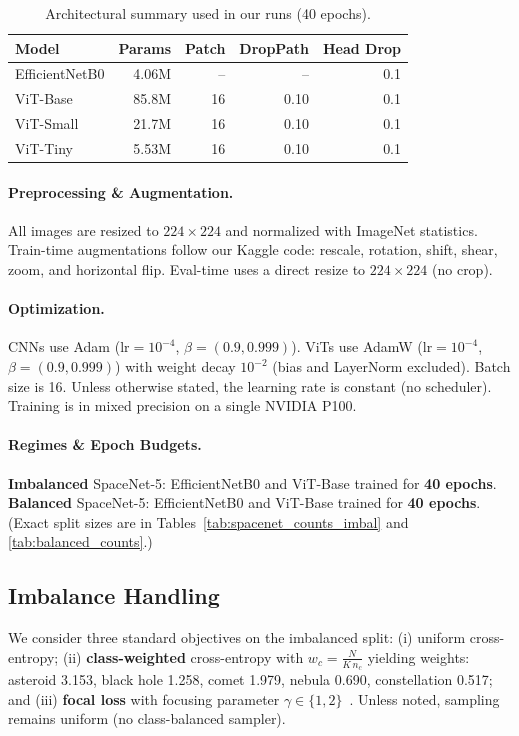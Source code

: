 \begin{table}[!t]
\centering
\caption{Architectural summary used in our runs (40 epochs).}
\begin{tabular}{lrrrr}
\toprule
Model          & Params & Patch & DropPath & Head Drop \\
\midrule
EfficientNetB0 & 4.06M  & --    & --       & 0.1 \\
ViT-Base       & 85.8M  & 16    & 0.10     & 0.1 \\
ViT-Small      & 21.7M  & 16    & 0.10     & 0.1 \\
ViT-Tiny       & 5.53M  & 16    & 0.10     & 0.1 \\
\bottomrule
\end{tabular}
\label{tab:model_configs}
\end{table}


\paragraph*{Preprocessing \& Augmentation.}
All images are resized to $224\times224$ and normalized with ImageNet statistics.
Train-time augmentations follow our Kaggle code: rescale, rotation, shift, shear, zoom, and horizontal flip.
Eval-time uses a direct resize to $224\times224$ (no crop).

\paragraph*{Optimization.}
CNNs use Adam ($\mathrm{lr}{=}10^{-4}$, $\beta{=}(0.9,0.999)$). ViTs use AdamW ($\mathrm{lr}{=}10^{-4}$, $\beta{=}(0.9,0.999)$) with weight decay $10^{-2}$ (bias and LayerNorm excluded).
Batch size is 16. Unless otherwise stated, the learning rate is constant (no scheduler).
Training is in mixed precision on a single NVIDIA P100.

\paragraph*{Regimes \& Epoch Budgets.}
\textbf{Imbalanced} SpaceNet-5: EfficientNetB0 and ViT-Base trained for \textbf{40 epochs}.
\textbf{Balanced} SpaceNet-5: EfficientNetB0 and ViT-Base trained for \textbf{40 epochs}.
(Exact split sizes are in Tables~\ref{tab:spacenet_counts_imbal} and \ref{tab:balanced_counts}.)

\subsection{Imbalance Handling}
We consider three standard objectives on the imbalanced split:
(i) uniform cross-entropy; (ii) \textbf{class-weighted} cross-entropy with
$w_c=\frac{N}{K\,n_c}$ yielding weights: asteroid 3.153, black hole 1.258, comet 1.979, nebula 0.690, constellation 0.517; and
(iii) \textbf{focal loss} with focusing parameter $\gamma\in\{1,2\}$~\cite{Lin2017FocalLoss}.
Unless noted, sampling remains uniform (no class-balanced sampler).

